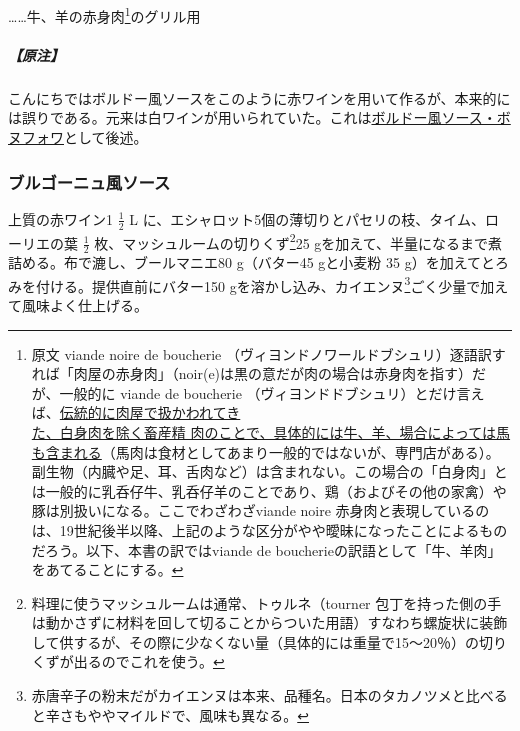 \begin{recette}
\ldots{}\ldots{}牛、羊の赤身肉\footnote{原文 viande noire de boucherie
  （ヴィヨンドノワールドブシュリ）逐語訳すれば「肉屋の赤身肉」（noir(e)は黒の意だが肉の場合は赤身肉を指す）だが、一般的に
  viande de boucherie
  （ヴィヨンドドブシュリ）とだけ言えば、\ul{伝統的に肉屋で扱かわれてき\\た、白身肉を除く畜産精
  肉のことで、具体的には牛、羊、場合によっては馬も含まれる}（馬肉は食材としてあまり一般的ではないが、専門店がある）。副生物（内臓や足、耳、舌肉など）は含まれない。この場合の「白身肉」とは一般的に乳呑仔牛、乳呑仔羊のことであり、鶏（およびその他の家禽）や豚は別扱いになる。ここでわざわざviande
  noire
  赤身肉と表現しているのは、19世紀後半以降、上記のような区分がやや曖昧になったことによるものだろう。以下、本書の訳ではviande
  de boucherieの訳語として「牛、羊肉」をあてることにする。}のグリル用

\hypertarget{nota-sauce-bordelaise}{%
\subparagraph{【原注】}\label{nota-sauce-bordelaise}}

こんにちではボルドー風ソースをこのように赤ワインを用いて作るが、本来的には誤りである。元来は白ワインが用いられていた。これは\protect\hyperlink{sauce-bonnefoy}{ボルドー風ソース・ボヌフォワ}として後述。

\atoaki{}

\hypertarget{sauce-bourguignonne}{%
\subsubsection{ブルゴーニュ風ソース}\label{sauce-bourguignonne}}



上質の赤ワイン1 \(\frac{1}{2}\) L
に、エシャロット5個の薄切りとパセリの枝、タイム、ローリエの葉
\(\frac{1}{2}\) 枚、マッシュルームの切りくず\footnote{料理に使うマッシュルームは通常、トゥルネ（tourner
  包丁を持った側の手は動かさずに材料を回して切ることからついた用語）すなわち螺旋状に装飾して供するが、その際に少なくない量（具体的には重量で15〜20％）の切りくずが出るのでこれを使う。}25
gを加えて、半量になるまで煮詰める。布で漉し、ブールマニエ80 g（バター45
gと小麦粉 35 g）を加えてとろみを付ける。提供直前にバター150
gを溶かし込み、カイエンヌ\footnote{赤唐辛子の粉末だがカイエンヌは本来、品種名。日本のタカノツメと比べると辛さもややマイルドで、風味も異なる。}ごく少量で加えて風味よく仕上げる。


\end{recette}
